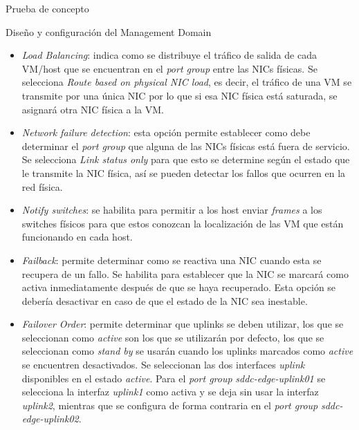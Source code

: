 \begin{section}{Prueba de concepto}
\begin{subsection}{Diseño y configuración del Management Domain}
\begin{itemize}
      \item \textit{Load Balancing}: indica como se distribuye el tráfico de salida de cada VM/host que se encuentran en el \textit{port group} entre las NICs físicas. Se selecciona \textit{Route based on physical NIC load}, es decir, el tráfico de una VM se transmite por una única NIC por lo que si esa NIC física está saturada, se asignará otra NIC física a la VM.
      
      \item \textit{Network failure detection}: esta opción permite establecer como debe determinar el \textit{port group} que alguna de las NICs físicas está fuera de servicio. Se selecciona \textit{Link status only} para que esto se determine según el estado que le transmite la NIC física, así se pueden detectar los fallos que ocurren en la red física.
      
      \item \textit{Notify switches}: se habilita para permitir a los host enviar \textit{frames} a los switches físicos para que estos conozcan la localización de las VM que están funcionando en cada host.
      
      \item \textit{Failback}: permite determinar como se reactiva una NIC cuando esta se recupera de un fallo. Se habilita para establecer que la NIC se marcará como activa inmediatamente después de que se haya recuperado. Esta opción se debería desactivar en caso de que el estado de la NIC sea inestable.
      
      \item \textit{Failover Order}: permite determinar que uplinks se deben utilizar, los que se seleccionan como \textit{active} son los que se utilizarán por defecto, los que se seleccionan como \textit{stand by} se usarán cuando los uplinks marcados como \textit{active} se encuentren desactivados. Se seleccionan las dos interfaces \textit{uplink} disponibles en el estado \textit{active}. Para el \textit{port group} \textit{sddc-edge-uplink01} se selecciona la interfaz \textit{uplink1} como activa y se deja sin usar la interfaz \textit{uplink2}, mientras que se configura de forma contraria en el \textit{port group} \textit{sddc-edge-uplink02}.
    \end{itemize}
    
    

\end{subsection}
\end{section}
